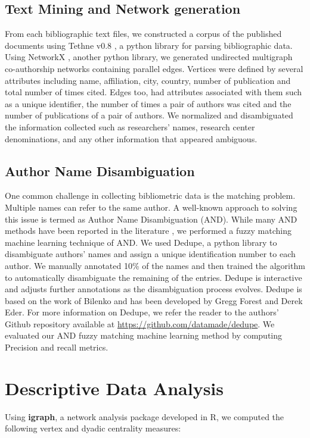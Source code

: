 \subsection{Text Mining and Network generation}
From each bibliographic text files, we constructed a corpus of the published documents using Tethne v0.8 \cite{peirson_tethne_2016}, a python library for parsing bibliographic data. Using NetworkX \cite{schult_exploring_2008}, another python library, we generated undirected multigraph co-authorship networks containing parallel edges. Vertices were defined by several attributes including name, affiliation, city, country, number of publication and total number of times cited. Edges too, had attributes associated with them such as a unique identifier, the number of times a pair of authors was cited and the number of publications of a pair of authors. We normalized and disambiguated the information collected such as researchers' names, research center denominations, and any other information that appeared ambiguous.

\subsection{Author Name Disambiguation}
One common challenge in collecting bibliometric data is the matching problem. Multiple names can refer to the same author. A well-known approach to solving this issue is termed as Author Name Disambiguation (AND). While many AND methods have been reported in the literature \cite{ferreira_brief_2012,giles_name_2005}, we performed a fuzzy matching machine learning technique of AND. We used Dedupe, a python library to disambiguate authors' names and assign a unique identification number to each author. We manually annotated 10\% of the names and then trained the algorithm to automatically disambiguate the remaining of the entries. Dedupe is interactive and adjusts further annotations as the disambiguation process evolves. Dedupe is based on the work of Bilenko \cite{bilenko_learnable_2006} and has been developed by Gregg Forest and Derek Eder. For more information on Dedupe, we refer the reader to the authors' Github repository available at \url{https://github.com/datamade/dedupe}. We evaluated our AND fuzzy matching machine learning method by computing Precision and recall metrics.

\section{Descriptive Data Analysis}
Using \textbf{igraph}, a network analysis package developed in R, we computed the following vertex and dyadic centrality measures:

